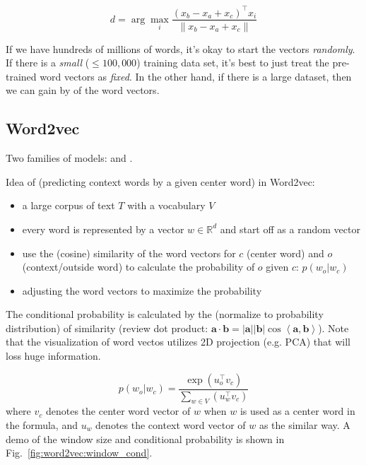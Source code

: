 \begin{equation}
d = \arg \max_i \frac{(x_b - x_a + x_c)^\top x_i}{\lVert x_b - x_a + x_c \rVert}
\end{equation}

If we have hundreds of millions of words, it's okay to start the vectors \emph{randomly}.
If there is a \emph{small} ($\le 100,000$) training data set, it's best to just treat the pre-trained word vectors as \emph{fixed}.
In the other hand, if there is a large dataset, then we can gain by  of the word vectors.

\subsection{Word2vec}

Two families of models:  and .

Idea of  (predicting context words by a given center word) in  Word2vec:

\begin{itemize}
	\item a large corpus of text $T$ with a vocabulary $V$
	\item every word is represented by a vector $w \in \mathbb{R}^d$ and start off as a random vector
	\item use the (cosine) similarity of the word vectors for $c$ (center word) and $o$ (context/outside word) to calculate the probability of $o$ given $c$: $p(w_o | w_c)$
	\item adjusting the word vectors to maximize the probability
\end{itemize}


The conditional probability is calculated by the  (normalize to probability distribution) of  similarity (review dot product: $\bm{a} \cdot \bm{b} = |\bm{a}||\bm{b}| \cos\left<\bm{a}, \bm{b}\right>$).
Note that the visualization of word vectos utilizes 2D projection (e.g. PCA) that will loss huge information.

\begin{equation}
p(w_o | w_c) = \frac{\exp(u_o^\top v_c)}{\sum_{w \in V}(u_w^\top v_c)}
\end{equation}
where $v_c$ denotes the center word vector of $w$ when $w$ is used as a center word in the formula, and $u_w$ denotes the context word vector of $w$ as the similar way.
A demo of the window size and conditional probability is shown in Fig.~\ref{fig:word2vec:window_cond}.

